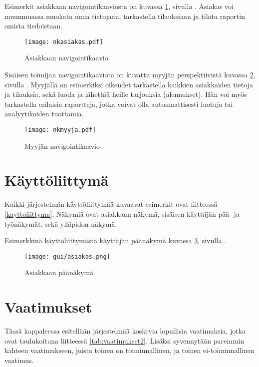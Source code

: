     Esimerkit asiakkaan navigointikaaviosta on kuvassa \ref{img:nkasiakas}, sivulla \pageref{img:nkasiakas}. Asiakas voi muunmuassa muokata omia tietojaan, tarkastella tilauksiaan ja tilata raportin omista tiedoistaan.

    \begin{figure}[h]
        \texttt{[image: nkasiakas.pdf]}
        \caption{Asiakkaan navigointikaavio}
        \label{img:nkasiakas}
    \end{figure}
    
    Sisäisen toimijan navigointikaaviota on kuvattu myyjän perspektiivistä kuvassa \ref{img:nkmyyja}, sivulla \pageref{img:nkmyyja}. Myyjällä on esimerkiksi oikeudet tarkastella kaikkien asiakkaiden tietoja ja tilauksia, sekä luoda ja lähettää heille tarjouksia (alennukset).
    Hän voi myös tarkastella erilaisia raportteja, jotka voivat olla automaattisesti luotuja tai analyytikoiden tuottamia.
    
    \begin{figure}[h]
        \texttt{[image: nkmyyja.pdf]}
        \caption{Myyjän navigointikaavio}
        \label{img:nkmyyja}
    \end{figure}

    \pagebreak

\section{Käyttöliittymä}  %
    
    Kaikki järjestelmän käyttöliittymää kuvaavat esimerkit ovat liitteessä \ref{kayttoliittyma}. Näkymiä ovat asiakkaan näkymä, sisäisen käyttäjän pää- ja työnäkymät, sekä ylläpidon näkymä.
    
    Esimerkkinä käyttöliittymästä käyttäjän päänäkymä kuvassa \ref{img:asiakasesimerkki}, sivulla \pageref{img:asiakasesimerkki}.

    \begin{figure}[h!]
        \texttt{[image: gui/asiakas.png]}
        \caption{Asiakkaan päänäkymä}
        \label{img:asiakasesimerkki}
    \end{figure}

\section{Vaatimukset}       %

    Tässä kappaleessa esitellään järjestelmää koskevia lopullisia vaatimuksia, jotka ovat taulukoituna liitteessä \ref{tab:vaatimukset2}.
    Lisäksi syvennytään paremmin kahteen vaatimukseen, joista toinen on toiminnallinen, ja toinen ei-toiminnallinen
    vaatimus.

